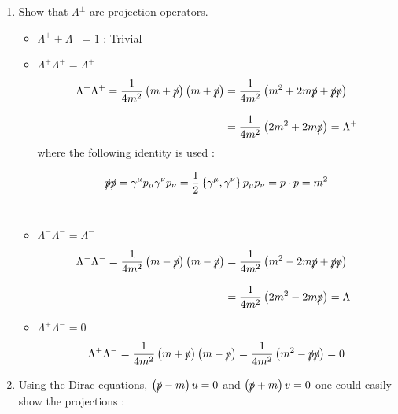 \begin{solution}
    \begin{enumerate}[label=(\alph*)]
        \item Show that $\Lambda^\pm$ are projection operators.
        
        \begin{itemize}
            \item $ \Lambda^+ + \Lambda^- = 1$ : Trivial
            
            \item $\Lambda^+\Lambda^+ = \Lambda^+$
            
                \begin{align*}
                    \Lambda^+ \Lambda^+ = \frac{1}{4m^2} \left(m+\slashed{p}\right)\left(m+\slashed{p}\right) &= \frac{1}{4m^2} \left( m^2 + 2m\slashed{p} + \slashed{p}\slashed{p} \right)  \\[0.12in]
                    &= \frac{1}{4m^2} \left( 2m^2 + 2m\slashed{p} \right) = \Lambda^+
                \end{align*}
                where the following identity is used : 

                \begin{align*}
                    \slashed{p} \slashed{p} = \gamma^\mu p_\mu \gamma^\nu p_\nu = \frac{1}{2} \left\{\gamma^\mu,\gamma^\nu \right\} p_\mu p_\nu = p \cdot p = m^2 
                \end{align*}\\
            
            \item  $\Lambda^-\Lambda^- = \Lambda^-$
            
                \begin{align*}
                    \Lambda^- \Lambda^- = \frac{1}{4m^2} \left(m-\slashed{p}\right)\left(m-\slashed{p}\right) &= \frac{1}{4m^2} \left( m^2 - 2m\slashed{p} + \slashed{p}\slashed{p} \right)  \\[0.12in]
                    &= \frac{1}{4m^2} \left( 2m^2 - 2m\slashed{p} \right) = \Lambda^-
                \end{align*}

            \item  $\Lambda^+\Lambda^- = 0$
            
                \begin{align*}
                    \Lambda^+ \Lambda^- = \frac{1}{4m^2} \left(m+\slashed{p}\right)\left(m-\slashed{p}\right) &= \frac{1}{4m^2} \left( m^2 -  \slashed{p}\slashed{p} \right) = 0 \\
                \end{align*}
        \end{itemize}
        \item Using the Dirac equations, $\left(\slashed{p}-m\right)u=0$ and $\left(\slashed{p}+m\right)v=0$ one could easily show the projections : 


\end{enumerate}
\end{solution}
